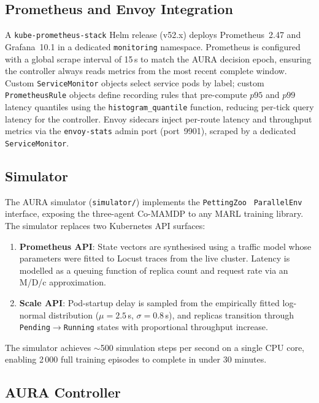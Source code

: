 \documentclass[conference]{IEEEtran}
\begin{document}
\subsection{Prometheus and Envoy Integration}

A \texttt{kube-prometheus-stack} Helm release (v52.x) deploys
Prometheus~2.47 and Grafana~10.1 in a dedicated \texttt{monitoring}
namespace. Prometheus is configured with a global scrape interval of
15\,s to match the AURA decision epoch, ensuring the controller
always reads metrics from the most recent complete window.
Custom \texttt{ServiceMonitor} objects select service pods by label;
custom \texttt{PrometheusRule} objects define recording rules that
pre-compute $p95$ and $p99$ latency quantiles using the
\texttt{histogram\_quantile} function, reducing per-tick query
latency for the controller. Envoy sidecars inject per-route latency
and throughput metrics via the \texttt{envoy-stats} admin port
(port~9901), scraped by a dedicated \texttt{ServiceMonitor}.

\subsection{Simulator}
\label{subsec:simulator}

The AURA simulator (\texttt{simulator/}) implements the
\texttt{PettingZoo}~\cite{Terry2021} \texttt{ParallelEnv} interface,
exposing the three-agent Co-MAMDP to any MARL training library.
The simulator replaces two Kubernetes API surfaces:
\begin{enumerate}
  \item \textbf{Prometheus API}: State vectors are synthesised using
        a traffic model whose parameters were fitted to Locust traces
        from the live cluster. Latency is modelled as a queuing
        function of replica count and request rate via an M/D/c
        approximation.
  \item \textbf{Scale API}: Pod-startup delay is sampled from the
        empirically fitted log-normal distribution ($\mu = 2.5$\,s,
        $\sigma = 0.8$\,s), and replicas transition through
        \texttt{Pending}$\to$\texttt{Running} states with
        proportional throughput increase.
\end{enumerate}
The simulator achieves $\sim$500 simulation steps per second on a
single CPU core, enabling 2\,000 full training episodes to complete
in under 30 minutes.

\subsection{AURA Controller}
\end{document}
